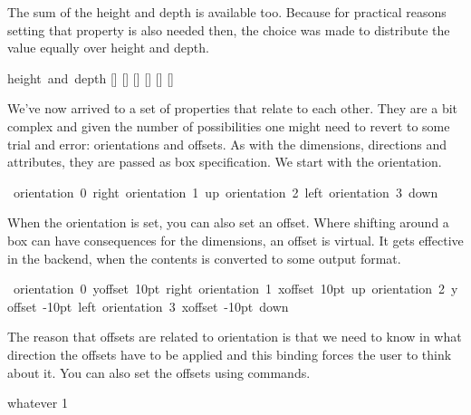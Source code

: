 \typebuffer[option=TEX]

\startlinecorrection
\getbuffer
\stoplinecorrection

The sum of the height and depth is available too. Because for practical reasons
setting that property is also needed then, the choice was made to distribute the
value equally over height and depth.

\startbuffer
\setbox\scratchbox\hbox {height and depth}
[\the\ht\scratchbox]
[\the\dp\scratchbox]
[\the\boxtotal\scratchbox]
\boxtotal\scratchbox=20pt
[\the\ht\scratchbox]
[\the\dp\scratchbox]
[\the\boxtotal\scratchbox]
\stopbuffer

\typebuffer[option=TEX]

\startlinecorrection
\getbuffer
\stoplinecorrection

We've now arrived to a set of properties that relate to each other. They are
a bit complex and given the number of possibilities one might need to revert
to some trial and error: orientations and offsets. As with the dimensions,
directions and attributes, they are passed as box specification. We start
with the orientation.

\startbuffer
\hbox \bgroup \showboxes
          \hbox orientation 0 {right}
    \quad \hbox orientation 1 {up}
    \quad \hbox orientation 2 {left}
    \quad \hbox orientation 3 {down}
\egroup
\stopbuffer

\typebuffer[option=TEX]

\startlinecorrection
\getbuffer
\stoplinecorrection

When the orientation is set, you can also set an offset. Where shifting around a box
can have consequences for the dimensions, an offset is virtual. It gets effective
in the backend, when the contents is converted to some output format.

\startbuffer
\hbox \bgroup \showboxes
          \hbox orientation 0 yoffset  10pt {right}
    \quad \hbox orientation 1 xoffset  10pt {up}
    \quad \hbox orientation 2 yoffset -10pt {left}
    \quad \hbox orientation 3 xoffset -10pt {down}
\egroup
\stopbuffer

\typebuffer[option=TEX]

\startlinecorrection
\getbuffer
\stoplinecorrection

The reason that offsets are related to orientation is that we need to know in
what direction the offsets have to be applied and this binding forces the user to
think about it. You can also set the offsets using commands.

\startbuffer
\setbox\scratchbox\hbox{whatever}%
1                                  \copy{} \boxorientation{}     \copy{} \boxxoffset    \scratchbox -15pt \copy{} \boxyoffset    \scratchbox -15pt \copy{}
\stopbuffer

